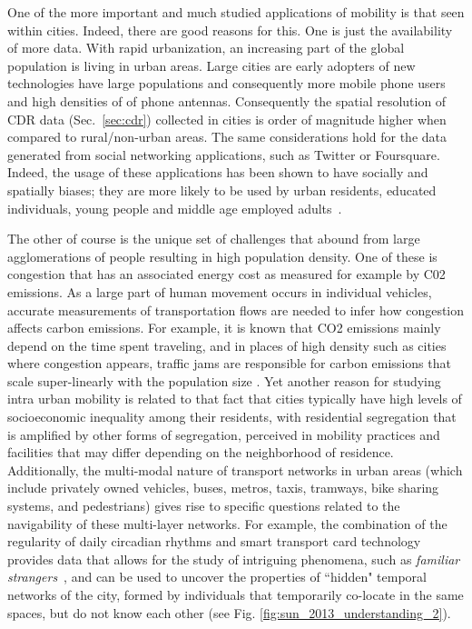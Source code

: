 One of the more important and much studied applications of mobility is that seen within cities. Indeed, there are good reasons for this. One is just the availability of more data. 
With rapid urbanization, an increasing part of the global population is living in urban areas.
Large cities are early adopters of new technologies have large populations and consequently more mobile phone users and high densities of 
of phone antennas.
Consequently the spatial resolution of CDR data (Sec.~\ref{sec:cdr}) collected in cities is order of magnitude higher when compared to rural/non-urban areas. 
%
The same considerations
hold for the data generated from social networking applications, such as
Twitter or Foursquare. Indeed, the usage of these applications has been shown to have socially and spatially 
biases; they are more likely to be used by urban residents, educated
individuals, young people and middle age employed
adults~\cite{adnan_2014_social}. 

The other of course is the unique set of challenges that abound from large agglomerations of people resulting in high population density. 
One of these is congestion that has an associated energy
cost as measured for example by C02 emissions. As a large part of human movement  occurs in individual
vehicles, accurate measurements of transportation flows are needed to infer how congestion affects carbon emissions. 
For example, it is known that CO2 emissions
mainly depend on the time spent traveling, and in places of high
density such as cities where congestion appears, traffic jams are
responsible for carbon emissions that
scale super-linearly with the population size \cite{louf_2013_modeling, louf_2014_how}. 
Yet another reason for studying intra urban mobility is related to that fact that cities
typically have  high levels of socioeconomic inequality among their residents, with residential segregation
that is amplified by other forms of segregation, perceived in mobility
practices and facilities that may differ depending on the neighborhood
of residence. Additionally, the multi-modal nature of transport networks
in urban areas (which include privately owned vehicles, buses, metros,
taxis, tramways, bike sharing systems, and pedestrians) gives
rise to specific questions related to the navigability of these
multi-layer networks. For example, the combination of the regularity of daily circadian
rhythms and smart transport card technology provides data
that allows for the study of intriguing phenomena, such as
\emph{familiar strangers}~\cite{sun_2013_understanding}, and can be used to uncover the
properties of ``hidden" temporal networks of the city, formed by
individuals that temporarily co-locate in the same spaces, but do not
know each other (see Fig. \ref{fig:sun_2013_understanding_2}). 
%



